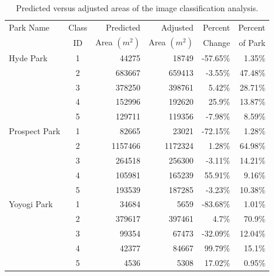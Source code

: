 \begin{table}[h]
    \centering
    \small
    \begin{tabular}{lcrrrr}
    \toprule
    Park Name &  Class &  Predicted &  Adjusted & Percent & Percent\\
     &  ID &  Area $ (m^{2}) $ &  Area $ (m^{2}) $ & Change & of Park\\
    \midrule
    Hyde Park &         1 &           44275 &          18749 &     -57.65\% &                       1.35\% \\
     &         2 &          683667 &         659413 &      -3.55\% &                      47.48\% \\
     &         3 &          378250 &         398761 &       5.42\% &                      28.71\% \\
     &         4 &          152996 &         192620 &       25.9\% &                      13.87\% \\
     &         5 &          129711 &         119356 &      -7.98\% &                       8.59\% \\
    \midrule
    Prospect Park &         1 &           82665 &          23021 &     -72.15\% &                       1.28\% \\
     &         2 &         1157466 &        1172324 &       1.28\% &                      64.98\% \\
     &         3 &          264518 &         256300 &      -3.11\% &                      14.21\% \\
     &         4 &          105981 &         165239 &      55.91\% &                       9.16\% \\
     &         5 &          193539 &         187285 &      -3.23\% &                      10.38\% \\
    \midrule
    Yoyogi Park &         1 &           34684 &           5659 &     -83.68\% &                       1.01\% \\
     &         2 &          379617 &         397461 &        4.7\% &                       70.9\% \\
     &         3 &           99354 &          67473 &     -32.09\% &                      12.04\% \\
     &         4 &           42377 &          84667 &      99.79\% &                       15.1\% \\
     &         5 &            4536 &           5308 &      17.02\% &                       0.95\% \\
    \bottomrule
    \end{tabular}
    \caption[Predicted and adjusted image classification]{Predicted versus adjusted areas of the image classification analysis.}
    \label{table:OBIA}
\end{table}

